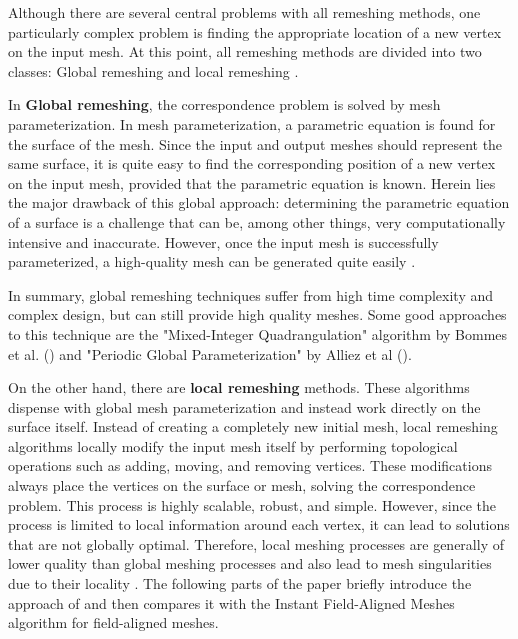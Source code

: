 \documentclass{ACGSeminar}
\begin{document}
Although there are several central problems with all remeshing methods, one particularly complex problem is finding the appropriate location of a new vertex on the input mesh. At this point, all remeshing methods are divided into two classes: Global remeshing and local remeshing \cite{botsch2007geometric,alliez2008recent}.\bigskip

In \textbf{Global remeshing}, the correspondence problem is solved by mesh parameterization. In mesh parameterization, a parametric equation is found for the surface of the mesh. Since the input and output meshes should represent the same surface, it is quite easy to find the corresponding position of a new vertex on the input mesh, provided that the parametric equation is known. Herein lies the major drawback of this global approach: determining the parametric equation of a surface is a challenge that can be, among other things, very computationally intensive and inaccurate. However, once the input mesh is successfully parameterized, a high-quality mesh can be generated quite easily \cite{jakob2015instant,alliez2008recent}.

In summary, global remeshing techniques suffer from high time complexity and complex design, but can still provide high quality meshes. Some good approaches to this technique are the "Mixed-Integer Quadrangulation" algorithm by Bommes et al. (\cite{bommes2009mixed}) and "Periodic Global Parameterization" by Alliez et al (\cite{ray2006periodic}).\bigskip

On the other hand, there are \textbf{local remeshing} methods. These algorithms dispense with global mesh parameterization and instead work directly on the surface itself. Instead of creating a completely new initial mesh, local remeshing algorithms locally modify the input mesh itself by performing topological operations such as adding, moving, and removing vertices. These modifications always place the vertices on the surface or mesh, solving the correspondence problem. This process is highly scalable, robust, and simple. However, since the process is limited to local information around each vertex, it can lead to solutions that are not globally optimal. Therefore, local meshing processes are generally of lower quality than global meshing processes and also lead to mesh singularities due to their locality \cite{jakob2015instant,alliez2008recent}. The following parts of the paper briefly introduce the approach of \cite{tarini2010practical} and then compares it with the Instant Field-Aligned Meshes algorithm for field-aligned meshes.
\end{document}
